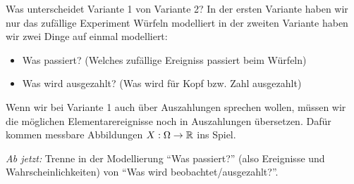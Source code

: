 \begin{disc}
Was unterscheidet Variante 1 von Variante 2? In der ersten Variante haben wir nur das zuf\"allige Experiment W\"urfeln modelliert in der zweiten Variante haben wir zwei Dinge auf einmal modelliert:
	\begin{itemize}
		\item Was passiert? (Welches zuf\"allige Ereigniss passiert beim W\"urfeln)
		\item Was wird ausgezahlt? (Was wird f\"ur Kopf bzw. Zahl ausgezahlt)
	\end{itemize}
Wenn wir bei Variante 1 auch \"uber Auszahlungen sprechen wollen, m\"ussen wir die m\"oglichen Elementarereignisse noch in Auszahlungen \"ubersetzen. Daf\"ur kommen messbare Abbildungen $X:\Omega \to \mathbb{R}$ ins Spiel.\smallskip	
	
 \textit{Ab jetzt:} Trenne in der Modellierung \enquote{Was passiert?} (also Ereignisse und Wahrscheinlichkeiten) von \enquote{Was wird beobachtet/ausgezahlt?}.
\end{disc}

